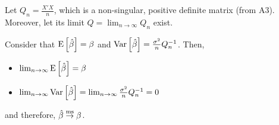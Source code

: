 \begin{remark}
Let $Q_n = \frac{X'X}{n}$, which is a non-singular, positive definite matrix (from A3). Moreover, let its limit $Q = \lim_{n\to\infty} Q_n$ exist.

Consider that $\operatorname{E}\left[\hat{\beta}\right]=\beta$ and $\operatorname{Var}\left[\hat{\beta}\right] = \frac{\sigma^2}{n}Q_n^{-1}$. Then, \begin{itemize}
\item $\lim_{n\to\infty}\operatorname{E}\left[\hat{\beta}\right] = \beta$
\item $\lim_{n\to\infty}\operatorname{Var}\left[\hat{\beta}\right] = \lim_{n\to\infty} \frac{\sigma^2}{n}Q_n^{-1} = 0$
\end{itemize}
and therefore, $\hat{\beta}\overset{\text{ms}}{\to}\beta$.
\end{remark}

\begin{remark}

\end{remark}